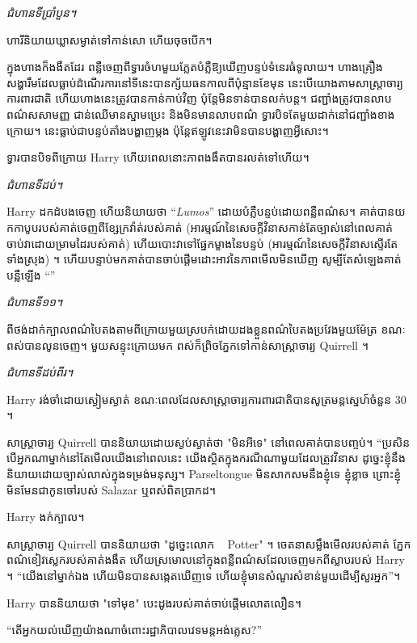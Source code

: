 {{\emph{ជំហានទីប្រាំបួន។}

ហារីនិយាយឃ្លាសម្ងាត់ទៅកាន់សោ ហើយចុចបើក។

ក្នុង​ហាង​ក៏​ងងឹត​ដែរ ពន្លឺ​ចេញ​ពី​ទ្វារ​ចំហ​មួយ​ភ្លែត​បំភ្លឺ​ឱ្យ​ឃើញ​បន្ទប់​ទំនេរ​ធំទូលាយ។ ហាងគ្រឿងសង្ហារឹមដែលធ្លាប់ដំណើរការនៅទីនេះបានក្ស័យធនកាលពីប៉ុន្មានខែមុន នេះបើយោងតាមសាស្ត្រាចារ្យការពារជាតិ ហើយហាងនេះត្រូវបានកាន់កាប់វិញ ប៉ុន្តែមិនទាន់បានលក់បន្ត។ ជញ្ជាំងត្រូវបានលាបពណ៌សសាមញ្ញ ជាន់ឈើមានស្នាមប្រេះ និងមិនមានលាបពណ៌ ទ្វារបិទតែមួយដាក់នៅជញ្ជាំងខាងក្រោយ។ នេះធ្លាប់ជាបន្ទប់តាំងបង្ហាញម្តង ប៉ុន្តែឥឡូវនេះវាមិនបានបង្ហាញអ្វីសោះ។

ទ្វារ​បាន​បិទ​ពី​ក្រោយ Harry ហើយ​ពេល​នោះ​ភាព​ងងឹត​បាន​រលត់​ទៅ​ហើយ​។

\emph{ជំហានទីដប់។}

Harry ដក​ដំបង​ចេញ ហើយ​និយាយ​ថា “\emph{Lumos}” ដោយ​បំភ្លឺ​បន្ទប់​ដោយ​ពន្លឺ​ពណ៌​ស។ គាត់បានយកកាបូបរបស់គាត់ចេញពីខ្សែក្រវ៉ាត់របស់គាត់ (អារម្មណ៍នៃសេចក្តីវិនាសកាន់តែច្បាស់នៅពេលគាត់ចាប់វាដោយម្រាមដៃរបស់គាត់) ហើយបោះវាទៅផ្នែកម្ខាងនៃបន្ទប់ (អារម្មណ៍នៃសេចក្តីវិនាសស្ទើរតែទាំងស្រុង) ។ ហើយ​បន្ទាប់​មក​គាត់​បាន​ចាប់​ផ្តើម​ដោះ​អាវ​នៃ​ភាព​មើល​មិន​ឃើញ សូម្បី​តែ​សំឡេង​គាត់​បន្លឺ​ឡើង “”

\emph{ជំហានទី១១។}

ពី​ថង់​ដាក់​ក្បាល​ពណ៌​បៃតង​តាម​ពីក្រោយ​មួយ​ស្របក់​ដោយ​ដងខ្លួន​ពណ៌​បៃតង​ប្រវែង​មួយ​ម៉ែត្រ ខណៈ​ពស់​បាន​លូន​ចេញ។ មួយសន្ទុះក្រោយមក ពស់ក៏ព្រិចភ្នែកទៅកាន់សាស្រ្តាចារ្យ Quirrell ។

\emph{ជំហានទីដប់ពីរ។}

Harry រង់ចាំដោយស្ងៀមស្ងាត់ ខណៈពេលដែលសាស្ត្រាចារ្យការពារជាតិបានសូត្រមន្តស្នេហ៍ចំនួន 30 ។

សាស្រ្តាចារ្យ Quirrell បាននិយាយដោយស្ងប់ស្ងាត់ថា "មិនអីទេ" នៅពេលគាត់បានបញ្ចប់។ “ប្រសិន​បើ​អ្នក​ណា​ម្នាក់​នៅ​តែ​មើល​យើង​នៅ​ពេល​នេះ យើង​ស្ថិត​ក្នុង​ករណី​ណា​មួយ​ដែល​ត្រូវ​វិនាស ដូច្នេះ​ខ្ញុំ​នឹង​និយាយ​ដោយ​ច្បាស់​លាស់​ក្នុង​ទម្រង់​មនុស្ស។ Parseltongue មិនសាកសមនឹងខ្ញុំទេ ខ្ញុំខ្លាច ព្រោះខ្ញុំមិនមែនជាកូនចៅរបស់ Salazar ឬពស់ពិតប្រាកដ។

Harry ងក់ក្បាល។

សាស្រ្តាចារ្យ Quirrell បាននិយាយថា "ដូច្នេះលោក ~ Potter" ។ ចេតនា​សម្លឹង​មើល​របស់​គាត់ ភ្នែក​ពណ៌​ខៀវ​ស្លេក​របស់​គាត់​ងងឹត ហើយ​ស្រមោល​នៅ​ក្នុង​ពន្លឺ​ពណ៌​ស​ដែល​ចេញ​មក​ពី​ស្លាប​របស់ Harry ។ “យើង​នៅ​ម្នាក់​ឯង ហើយ​មិន​បាន​សង្កេត​ឃើញ​ទេ ហើយ​ខ្ញុំ​មាន​សំណួរ​សំខាន់​មួយ​ដើម្បី​សួរ​អ្នក”។

Harry បាននិយាយថា "ទៅមុខ" បេះដូងរបស់គាត់ចាប់ផ្តើមលោតលឿន។

“តើ​អ្នក​យល់​ឃើញ​យ៉ាង​ណា​ចំពោះ​រដ្ឋាភិបាល​វេទមន្ត​អង់គ្លេស?”

}}
